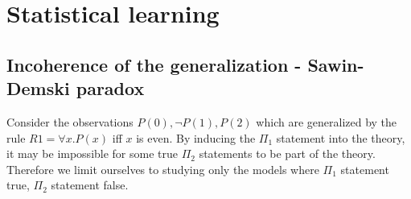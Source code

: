\chapter{Statistical learning}

\section{Incoherence of the generalization - Sawin-Demski paradox}
Consider the observations $P(0), \neg P(1), P(2)$ which are generalized by the rule $R1=\forall x. P(x)$ iff $x$ is even.
By inducing the $\Pi_1$ statement into the theory, it may be impossible for some true $\Pi_2$ statements to be part of the theory\cite{sawin2013}.
Therefore we limit ourselves to studying only the models where $\Pi_1$ statement true, $\Pi_2$ statement false.
